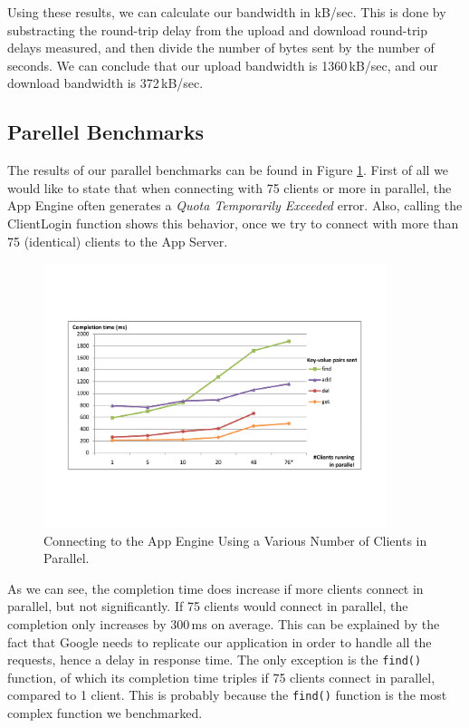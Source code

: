 Using these results, we can calculate our bandwidth in kB/sec. This is done by
substracting the round-trip delay from the upload and download round-trip delays
measured, and then divide the number of bytes sent by the number of seconds.
We can conclude that our upload bandwidth is 1360\,kB/sec, and our download
bandwidth is 372\,kB/sec.

\subsection{Parellel Benchmarks}
The results of our parallel benchmarks can be found in Figure
\ref{benchmarks-parallel-fig}. First of all we would like to state that when
connecting with 75 clients or more in parallel, the App Engine often generates a
\emph{Quota Temporarily Exceeded} error. Also, calling the ClientLogin function
shows this behavior, once we try to connect with more than 75 (identical) clients
to the App Server.
 
\begin{figure} %
\begin{center}
\includegraphics[trim=5cm 4cm 5cm 5cm,width=10cm]{./figures/parallel.pdf}
\caption{Connecting to the App Engine Using a Various Number of Clients in
Parallel. \label{benchmarks-parallel-fig}}
\end{center}
\end{figure}
 
As we can see, the completion time does increase if more clients connect in
parallel, but not significantly. If 75 clients would connect in parallel, the
completion only increases by 300\,ms on average. This can be explained by the
fact that Google needs to replicate our application in order to handle all the
requests, hence a delay in response time. The only exception is the
\texttt{find()} function, of which its completion time triples if 75 clients
connect in parallel, compared to 1 client. This is probably because the
\texttt{find()} function is the most complex function we benchmarked.

